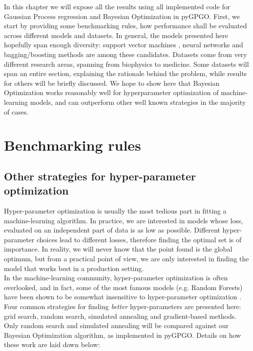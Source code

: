 \documentclass[10pt,a4paper,twoside]{book}
\begin{document}
In this chapter we will expose all the results using all implemented code for Gaussian Process regression and Bayesian Optimization in pyGPGO. First, we start by providing some benchmarking rules, how performance shall be evaluated across different models and datasets. In general, the models presented here hopefully span enough diversity: support vector machines , neural networks and bagging/boosting methods are among these candidates. Datasets come from very different research areas, spanning from biophysics to medicine. Some datasets will span an entire section, explaining the rationale behind the problem, while results for others will be briefly discussed. We hope to show here that Bayesian Optimization works reasonably well for hyperparameter optimization of machine-learning models, and can outperform other well known strategies in the majority of cases.


\section{Benchmarking rules}
\subsection{Other strategies for hyper-parameter optimization}

Hyper-parameter optimization is usually the most tedious part in fitting a machine-learning algorithm. In practice, we are interested in models whose loss, evaluated on an independent part of data is as low as possible. Different hyper-parameter choices lead to different losses, therefore finding the optimal set is of importance. In reality, we will never know that the point found is the global optimum, but from a practical point of view, we are only interested in finding the model that works best in a production setting.\\

In the machine-learning community, hyper-parameter optimization is often overlooked, and in fact, some of the most famous models (e.g. Random Forests) have been shown to be somewhat insensitive to hyper-parameter optimization \cite{Verikas2011}. Four common strategies for finding \textit{better} hyper-parameters are presented here: grid search, random search, simulated annealing and gradient-based methods. Only random search and simulated annealing will be compared against our Bayesian Optimization algorithm, as implemented in pyGPGO. Details on how these work are laid down below:
\end{document}
